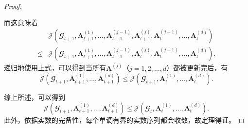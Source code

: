 \begin{proof}
\begin{enumerate}[noitemsep]
        而这意味着
        \begin{equation*}
        \begin{aligned} &\mathcal{J}(\mathbfcal{G}_{t+1},\boldsymbol{A}^{(1)}_{t+1},\ldots,\boldsymbol{A}^{(j-1)}_{t+1},\boldsymbol{A}^{(j)}_{t+1},\boldsymbol{A}^{(j+1)}_{t}, \ldots,\boldsymbol{A}^{(d)}_{t}) \\\le &\mathcal{J}(\mathbfcal{G}_{t+1},\boldsymbol{A}^{(1)}_{t+1},\ldots,\boldsymbol{A}^{(j-1)}_{t+1},\boldsymbol{A}^{(j)}_{t},\boldsymbol{A}^{(j+1)}_{t}, \ldots,\boldsymbol{A}^{(d)}_{t}).
        \end{aligned}
        \end{equation*}
        递归地使用上式，可以得到当所有$\boldsymbol{A}^{(j)}$（$j=1,2,\ldots,d$）都被更新完后，有
        \begin{equation*}
        \label{eq:conv2}
            \mathcal{J}(\mathbfcal{G}_{t+1},\boldsymbol{A}^{(1)}_{t+1},\ldots,\boldsymbol{A}^{(d)}_{t+1}) \le \mathcal{J}(\mathbfcal{G}_{t+1},\boldsymbol{A}^{(1)}_{t},\ldots,\boldsymbol{A}^{(d)}_{t}).
        \end{equation*}
    \end{enumerate}
    
    综上所述，可以得到
    \begin{equation*}
        \mathcal{J}(\mathbfcal{G}_{t+1},\boldsymbol{A}^{(1)}_{t+1},\ldots,\boldsymbol{A}^{(d)}_{t+1}) \le \mathcal{J}(\mathbfcal{G}_{t},\boldsymbol{A}^{(1)}_{t},\ldots,\boldsymbol{A}^{(d)}_{t}).
    \end{equation*}
    此外，依据实数的完备性，每个单调有界的实数序列都会收敛，故定理得证。
\end{proof}\vspace{0.5em}

